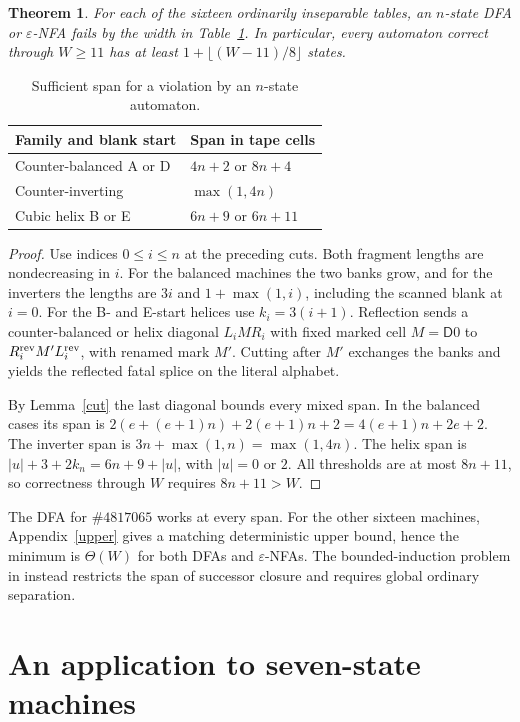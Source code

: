 \documentclass[11pt]{article}
\newtheorem{theorem}{Theorem}
\newcommand{\state}[1]{\mathsf{#1}}
\newcommand{\eps}{\varepsilon}
\begin{document}
\begin{theorem}\label{widththm}
For each of the sixteen ordinarily inseparable tables, an \(n\)-state DFA or \(\eps\)-NFA fails by the width in Table~\ref{widths}. In particular, every automaton correct through \(W\ge11\) has at least \(1+\lfloor(W-11)/8\rfloor\) states.
\end{theorem}
\begin{table}[ht]
\centering
\caption{Sufficient span for a violation by an \(n\)-state automaton.}\label{widths}
\begin{tabular}{@{}ll@{}}
\toprule
Family and blank start & Span in tape cells\\
\midrule
Counter-balanced A or D & \(4n+2\) or \(8n+4\)\\
Counter-inverting & \(\max(1,4n)\)\\
Cubic helix B or E & \(6n+9\) or \(6n+11\)\\
\bottomrule
\end{tabular}
\end{table}
\begin{proof}
Use indices \(0\le i\le n\) at the preceding cuts. Both fragment lengths are nondecreasing in \(i\). For the balanced machines the two banks grow, and for the inverters the lengths are \(3i\) and \(1+\max(1,i)\), including the scanned blank at \(i=0\). For the B- and E-start helices use \(k_i=3(i+1)\). Reflection sends a counter-balanced or helix diagonal \(L_i M R_i\) with fixed marked cell \(M=\state D0\) to \(R_i^{\rm rev}M'L_i^{\rm rev}\), with renamed mark \(M'\). Cutting after \(M'\) exchanges the banks and yields the reflected fatal splice on the literal alphabet.

By Lemma~\ref{cut} the last diagonal bounds every mixed span. In the balanced cases its span is \(2(e+(e+1)n)+2(e+1)n+2=4(e+1)n+2e+2\). The inverter span is \(3n+\max(1,n)=\max(1,4n)\). The helix span is \(|u|+3+2k_n=6n+9+|u|\), with \(|u|=0\) or \(2\). All thresholds are at most \(8n+11\), so correctness through \(W\) requires \(8n+11>W\).
\end{proof}

The DFA for \(\#4817065\) works at every span. For the other sixteen machines, Appendix~\ref{upper} gives a matching deterministic upper bound, hence the minimum is \(\Theta(W)\) for both DFAs and \(\eps\)-NFAs. The bounded-induction problem in \cite{cost} instead restricts the span of successor closure and requires global ordinary separation.

\section{An application to seven-state machines}\label{seven}
\end{document}
